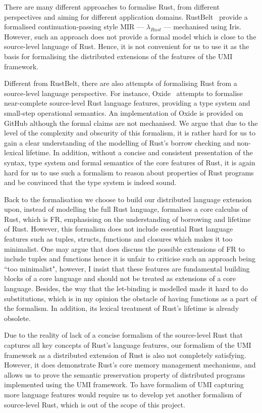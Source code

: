 There are many different approaches to formalise Rust, from different perspectives and aiming for different application domains. RustBelt~\citep{10.1145/3158154} provide a formalised continuation-passing style MIR --- $\lambda_{\textit{Rust}}$ --- mechanised using Iris. However, such an approach does not provide a formal model which is close to the source-level language of Rust. Hence, it is not convenient for us to use it as the basis for formalising the distributed extensions of the features of the UMI framework.

Different from RustBelt, there are also attempts of formalising Rust from a source-level language perspective. For instance, Oxide~\citep{weiss2021oxide} attempts to formalise near-complete source-level Rust language features, providing a type system and small-step operational semantics. An implementation of Oxide is provided on GitHub although the formal claims are not mechanised. We argue that due to the level of the complexity and obscurity of this formalism, it is rather hard for us to gain a clear understanding of the modelling of Rust's borrow checking and non-lexical lifetime. In addition, without a concise and consistent presentation of the syntax, type system and formal semantics of the core features of Rust, it is again hard for us to use such a formalism to reason about properties of Rust programs and be convinced that the type system is indeed sound.

Back to the formalisation we choose to build our distributed language extension upon, instead of modelling the full Rust language, \citet{10.1145/3443420} formalises a core calculus of Rust, which is FR, emphasising on the understanding of borrowing and lifetime of Rust. However, this formalism does not include essential Rust language features such as tuples, structs, functions and closures which makes it too minimalist. One may argue that \citet{10.1145/3443420} does discuss the possible extensions of FR to include tuples and functions hence it is unfair to criticise such an approach being ``too minimalist", however, I insist that these features are fundamental building blocks of a core language and should not be treated as extensions of a core language. Besides, the way that the let-binding is modelled made it hard to do substitutions, which is in my opinion the obstacle of having functions as a part of the formalism. In addition, its lexical treatment of Rust's lifetime is already obsolete.

Due to the reality of lack of a concise formalism of the source-level Rust that captures all key concepts of Rust's language features, our formalism of the UMI framework as a distributed extension of Rust is also not completely satisfying. However, it does demonstrate Rust's core memory management mechanisms, and allows us to prove the semantic preservation property of distributed programs implemented using the UMI framework. To have formalism of UMI capturing more language features would require us to develop yet another formalism of source-level Rust, which is out of the scope of this project.

